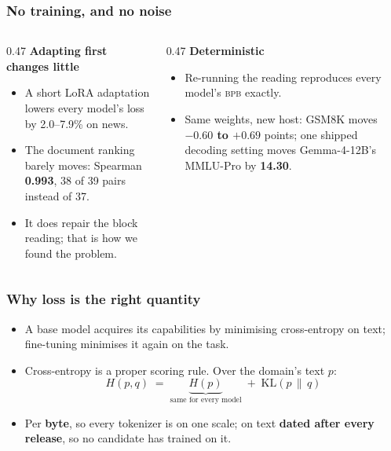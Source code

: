 \documentclass[aspectratio=169,11pt]{beamer}
\newcommand{\bpb}{\textsc{bpb}}
\newcommand{\keyw}[1]{\textcolor{accent}{\textbf{#1}}}
\newcommand{\warmw}[1]{\textcolor{warm}{\textbf{#1}}}
\newcommand{\goodw}[1]{\textcolor{good}{\textbf{#1}}}
\begin{document}
\begin{frame}
  \frametitle{No training, and no noise}

  \vspace{0.5em}
  \begin{columns}[t]
  \begin{column}{0.47\textwidth}
    \keyw{Adapting first changes little}
    \begin{itemize}\setlength\itemsep{0.4em}\small
      \item A short LoRA adaptation lowers every model's loss by 2.0--7.9\% on news.
      \item The document ranking barely moves: Spearman \goodw{0.993}, 38 of 39 pairs instead of 37.
      \item It does repair the block reading; that is how we found the problem.
    \end{itemize}
  \end{column}
  \begin{column}{0.47\textwidth}
    \keyw{Deterministic}
    \begin{itemize}\setlength\itemsep{0.4em}\small
      \item Re-running the reading reproduces every model's \bpb{} exactly.
      \item Same weights, new host: GSM8K moves \warmw{$-0.60$ to $+0.69$} points; one shipped
        decoding setting moves Gemma-4-12B's MMLU-Pro by \warmw{14.30}.
    \end{itemize}
  \end{column}
  \end{columns}
\end{frame}

\begin{frame}
  \frametitle{Why loss is the right quantity}

  \vspace{0.7em}
  \begin{itemize}\setlength\itemsep{0.8em}
    \item A base model acquires its capabilities by minimising cross-entropy on text; fine-tuning
      minimises it again on the task.
    \item Cross-entropy is a proper scoring rule. Over the domain's text $p$:
      \[ H(p,q) \;=\; \underbrace{H(p)}_{\text{same for every model}} \;+\; \mathrm{KL}(p\,\|\,q) \]
    \item Per \keyw{byte}, so every tokenizer is on one scale; on text \keyw{dated after every
      release}, so no candidate has trained on it.
  \end{itemize}
\end{frame}
\end{document}
